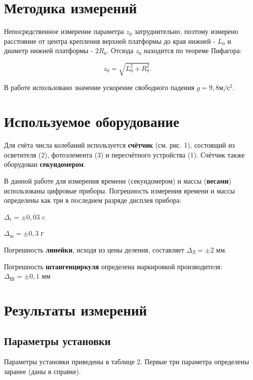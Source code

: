 \documentclass{report}
\begin{document}
	\section*{Методика измерений}
	
	\hspace{4mm}Непосредственное измерение параметра $z_{0}$ затруднительно, поэтому измерено расстояние от центра крепления верхней платформы до края нижней - $L_{0}$ и диаметр нижней платформы - $2R_{0}$. Отсюда $z_{0}$ находится по теореме Пифагора:
	
	\begin{equation}
		z_{0} = \sqrt{L_{0}^{2} + R_{0}^{2}}.
	\end{equation}	
	
	В работе использовано значение ускорение свободного падения $g = 9,8 {м/с^{2}}$.
	
	\section*{Используемое оборудование}
	
	Для счёта числа колебаний используется \textbf{счётчик} (см. рис. 1), состоящий из осветителя (2), фотоэлемента (3) и пересчётного устройства (1). Счётчик также оборудован \textbf{секундомером}.
	
	В данной работе для измерения времени (секундомером) и массы (\textbf{весами}) использованы цифровые приборы. Погрешность измерения времени и массы определены как три в последнем разряде дисплея прибора:
	
	$\Delta_{\text{t}} = \pm 0,03$ c
	
	$\Delta_{\text{m}} = \pm 0,3$ г
	
	Погрешность \textbf{линейки}, исходя из цены деления, составляет $\Delta_{\text{Л}} = \pm 2$ мм. 
	
	Погрешность \textbf{штангенциркуля} определена маркировкой производителя: $\Delta_{\text{Ш}} = \pm 0,1$ мм
	
	\section*{Результаты измерений}
	
	\subsection*{Параметры установки}
	
	Параметры установки приведены в таблице 2. Первые три параметра определены заранее (даны в справке). 
	
\end{document}
